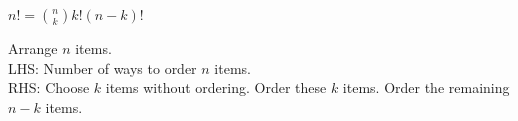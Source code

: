\question $n! = \binom{n}{k}k!(n - k)!$ \\

\begin{solution}[2 cm]
Arrange $n$ items. \\
LHS: Number of ways to order $n$ items. \\
RHS: Choose $k$ items without ordering. Order these $k$ items. 
Order the remaining $n - k$ items.
\end{solution}